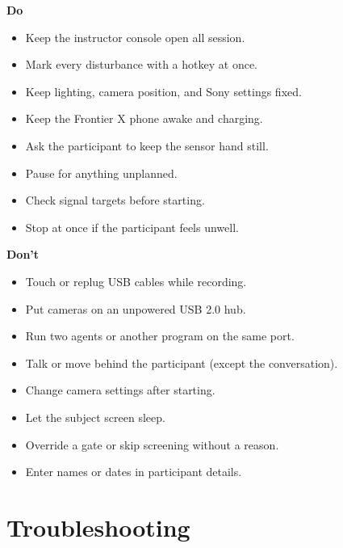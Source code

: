 \documentclass[11pt,a4paper]{article}
\begin{document}
\begin{minipage}[t]{0.48\linewidth}
\begin{tipbox}
\textbf{Do}
\begin{itemize}[leftmargin=*]
  \item Keep the instructor console open all session.
  \item Mark every disturbance with a hotkey at once.
  \item Keep lighting, camera position, and Sony settings fixed.
  \item Keep the Frontier X phone awake and charging.
  \item Ask the participant to keep the sensor hand still.
  \item Pause for anything unplanned.
  \item Check signal targets before starting.
  \item Stop at once if the participant feels unwell.
\end{itemize}
\end{tipbox}
\end{minipage}\hfill
\begin{minipage}[t]{0.48\linewidth}
\begin{warnbox}
\textbf{Don't}
\begin{itemize}[leftmargin=*]
  \item Touch or replug USB cables while recording.
  \item Put cameras on an unpowered USB 2.0 hub.
  \item Run two agents or another program on the same port.
  \item Talk or move behind the participant (except the conversation).
  \item Change camera settings after starting.
  \item Let the subject screen sleep.
  \item Override a gate or skip screening without a reason.
  \item Enter names or dates in participant details.
\end{itemize}
\end{warnbox}
\end{minipage}

\section{Troubleshooting}
\end{document}
